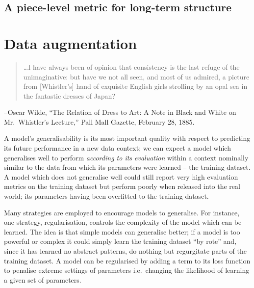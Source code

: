 \documentclass[12pt,a4paper,]{report}
\begin{document}
\hypertarget{a-piece-level-metric-for-long-term-structure}{%
\section{A piece-level metric for long-term
structure}\label{a-piece-level-metric-for-long-term-structure}}

\hypertarget{data-augmentation}{%
\chapter{Data augmentation}\label{data-augmentation}}

\begin{quote}
\ldots I have always been of opinion that consistency is the last refuge
of the unimaginative: but have we not all seen, and most of us admired,
a picture from {[}Whistler's{]} hand of exquisite English girls
strolling by an opal sea in the fantastic dresses of Japan?
\end{quote}

-- Oscar Wilde, ``The Relation of Dress to Art: A Note in Black and
White on Mr.~Whistler's Lecture,'' Pall Mall Gazette, February 28, 1885.

A model's generalisability is its most important quality with respect to
predicting its future performance in a new data context; we can expect a
model which generalises well to perform \emph{according to its
evaluation} within a context nominally similar to the data from which
its parameters were learned -- the training dataset. A model which does
not generalise well could still report very high evaluation metrics on
the training dataset but perform poorly when released into the real
world; its parameters having been overfitted to the training dataset.

Many strategies are employed to encourage models to generalise. For
instance, one strategy, regularisation, controls the complexity of the
model which can be learned. The idea is that simple models can
generalise better; if a model is too powerful or complex it could simply
learn the training dataset ``by rote'' and, since it has learned no
abstract patterns, do nothing but regurgitate parts of the training
dataset. A model can be regularised by adding a term to its loss
function to penalise extreme settings of parameters i.e.~changing the
likelihood of learning a given set of parameters.
\end{document}
